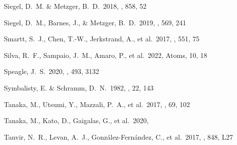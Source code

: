 \documentclass[twocolumn, twocolappendix]{aastex63}
\begin{document}
\begin{thebibliography}{}


 Siegel, D.~M. \& Metzger, B.~D.\ 2018, \apj, 858, 52


 Siegel, D.~M., Barnes, J., \& Metzger, B.~D.\ 2019, \nat, 569, 241


 Smartt, S.~J., Chen, T.-W., Jerkstrand, A., et al.\ 2017, \nat, 551, 75


 Silva, R.~F., Sampaio, J.~M., Amaro, P., et al.\ 2022, Atoms, 10, 18





 Speagle, J.~S.\ 2020, \mnras, 493, 3132

 Symbalisty, E. \& Schramm, D.~N.\ 1982, \aplett, 22, 143






 Tanaka, M., Utsumi, Y., Mazzali, P.~A., et al.\ 2017, \pasj, 69, 102




 Tanaka, M., Kato, D., Gaigalas, G., et al.\ 2020, \mnras


 Tanvir, N.~R., Levan, A.~J., Gonz{\'a}lez-Fern{\'a}ndez, C., et al.\ 2017, \apjl, 848, L27





\end{thebibliography}
\end{document}
